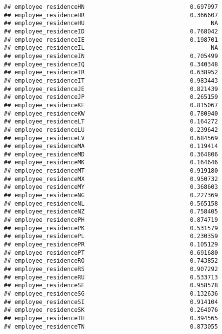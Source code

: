 \documentclass[
]{article}
\begin{document}
\begin{verbatim}
## employee_residenceHN                              0.697997    
## employee_residenceHR                              0.366607    
## employee_residenceHU                                    NA    
## employee_residenceID                              0.768042    
## employee_residenceIE                              0.198701    
## employee_residenceIL                                    NA    
## employee_residenceIN                              0.705499    
## employee_residenceIQ                              0.340348    
## employee_residenceIR                              0.638952    
## employee_residenceIT                              0.983443    
## employee_residenceJE                              0.821439    
## employee_residenceJP                              0.265159    
## employee_residenceKE                              0.815067    
## employee_residenceKW                              0.780940    
## employee_residenceLT                              0.164272    
## employee_residenceLU                              0.239642    
## employee_residenceLV                              0.684569    
## employee_residenceMA                              0.119414    
## employee_residenceMD                              0.364806    
## employee_residenceMK                              0.164646    
## employee_residenceMT                              0.919180    
## employee_residenceMX                              0.950732    
## employee_residenceMY                              0.368603    
## employee_residenceNG                              0.227369    
## employee_residenceNL                              0.565158    
## employee_residenceNZ                              0.758405    
## employee_residencePH                              0.874719    
## employee_residencePK                              0.531579    
## employee_residencePL                              0.230359    
## employee_residencePR                              0.105129    
## employee_residencePT                              0.691680    
## employee_residenceRO                              0.743852    
## employee_residenceRS                              0.907292    
## employee_residenceRU                              0.533713    
## employee_residenceSE                              0.958578    
## employee_residenceSG                              0.132636    
## employee_residenceSI                              0.914104    
## employee_residenceSK                              0.264076    
## employee_residenceTH                              0.394565    
## employee_residenceTN                              0.873055    

\end{verbatim}
\end{document}
